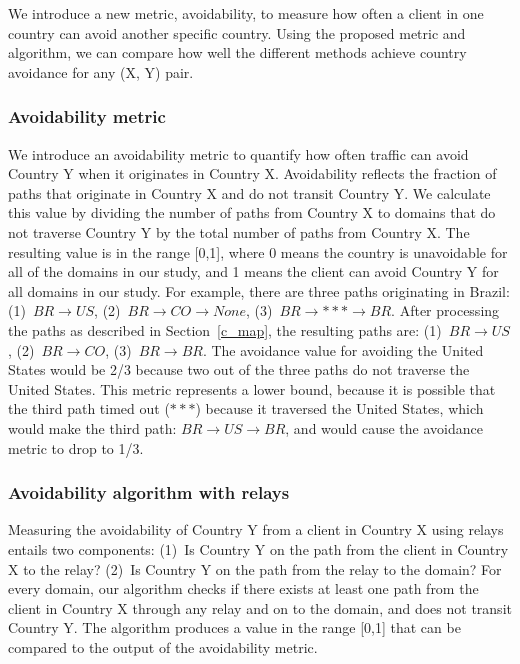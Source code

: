 We introduce a new metric, avoidability, to measure how often a client in
one country can avoid another specific country.
Using the proposed metric
and algorithm, we can compare how well the different methods achieve
country avoidance for any (X, Y) pair.

\subsubsection{Avoidability metric}  We introduce an avoidability metric to
quantify how often
traffic can avoid Country Y when it originates in Country X.
Avoidability reflects the fraction of paths that originate in Country
X and do not transit Country Y.  We calculate this value by dividing the
number of paths from Country X to domains that do not traverse Country Y
by the total number of paths from Country X. The resulting value is
in the range [0,1], where 0 means the country is unavoidable for all of
the domains in our study, and 1 means the client can avoid Country Y for
all domains in our study.  For example, there are three paths
originating in Brazil: (1)~$BR \rightarrow US$, (2)~$BR \rightarrow CO
\rightarrow None$, (3)~$BR \rightarrow *** \rightarrow BR$.  After
processing the paths as described in Section~\ref{c_map}, the resulting
paths are: (1)~$BR \rightarrow US$, (2)~$BR \rightarrow CO$, (3)~$BR
\rightarrow BR$.  The avoidance value for avoiding the United States
would be 2/3 because two out of the three paths do not traverse the
United States.  This metric represents a lower bound,
because it is possible that the third path timed out ($***$) because it
traversed the United States, which would make the third path: $BR
\rightarrow US \rightarrow BR$, and would cause the avoidance metric to
drop to 1/3.

\subsubsection{Avoidability algorithm with relays}  Measuring the avoidability of Country Y
from a client in Country X using relays entails two components: (1)~Is Country Y
on the path from the client in Country X to the relay?  (2)~Is Country Y on
the path from the relay to the domain?  For every domain, our algorithm checks
if there exists at least one path from the client in Country X through any
relay and on to the domain, and does not transit Country Y.   The algorithm
 produces a value in the range [0,1] that can be
compared to the output of the avoidability metric.

